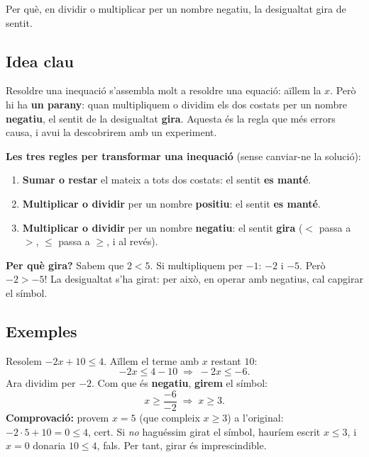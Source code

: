 %
{Per què, en dividir o multiplicar per un nombre negatiu, la desigualtat gira de sentit.}

\subsection{Idea clau}

Resoldre una inequació s'assembla molt a resoldre una equació: aïllem la $x$. Però
hi ha \textbf{un parany}: quan multipliquem o dividim els dos costats per un nombre
\textbf{negatiu}, el sentit de la desigualtat \textbf{gira}. Aquesta és la regla que
més errors causa, i avui la descobrirem amb un experiment.

\begin{idea}
\textbf{Les tres regles per transformar una inequació} (sense canviar-ne la solució):
\begin{enumerate}[leftmargin=1.6em, itemsep=2pt]
  \item \textbf{Sumar o restar} el mateix a tots dos costats: el sentit
        \textbf{es manté}.
  \item \textbf{Multiplicar o dividir} per un nombre \textbf{positiu}: el sentit
        \textbf{es manté}.
  \item \textbf{Multiplicar o dividir} per un nombre \textbf{negatiu}: el sentit
        \textbf{gira} ($<$ passa a $>$, $\le$ passa a $\ge$, i al revés).
\end{enumerate}
\textbf{Per què gira?} Sabem que $2<5$. Si multipliquem per $-1$: $-2$ i $-5$. Però
$-2>-5$! La desigualtat s'ha girat: per això, en operar amb negatius, cal capgirar
el símbol.
\end{idea}

\subsection{Exemples}

\begin{exemple}
Resolem $-2x+10\le 4$. Aïllem el terme amb $x$ restant $10$:
\[
-2x\le 4-10 \;\Rightarrow\; -2x\le -6.
\]
Ara dividim per $-2$. Com que és \textbf{negatiu}, \textbf{girem} el símbol:
\[
x\ge \frac{-6}{-2} \;\Rightarrow\; x\ge 3.
\]
\textbf{Comprovació:} provem $x=5$ (que compleix $x\ge 3$) a l'original:
$-2\cdot 5+10=0\le 4$, cert. Si \emph{no} haguéssim girat el símbol, hauríem escrit
$x\le 3$, i $x=0$ donaria $10\le 4$, fals. Per tant, girar és imprescindible.
\end{exemple}

